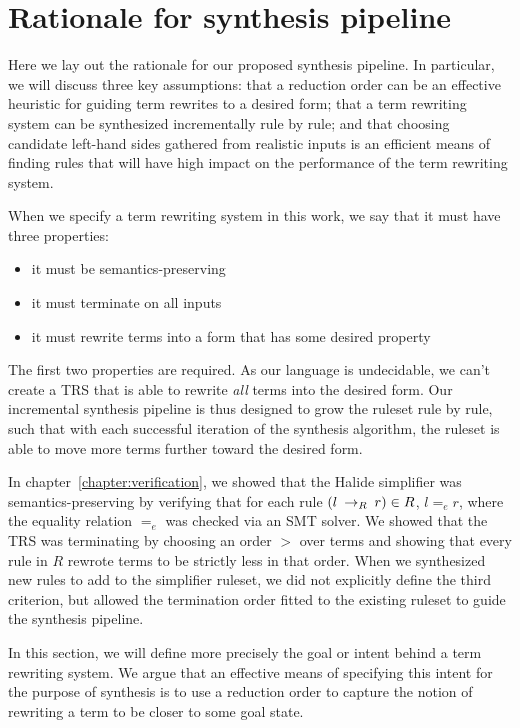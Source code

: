 \section{Rationale for synthesis pipeline}

Here we lay out the rationale for our proposed synthesis pipeline. In particular, we will discuss three key assumptions: that a reduction order can be an effective heuristic for guiding term rewrites to a desired form; that a term rewriting system can be synthesized incrementally rule by rule; and that choosing candidate left-hand sides gathered from realistic inputs is an efficient means of finding rules that will have high impact on the performance of the term rewriting system.

When we specify a term rewriting system in this work, we say that it must have three properties:

\begin{itemize}
    \item it must be semantics-preserving
    \item it must terminate on all inputs
    \item it must rewrite terms into a form that has some desired property
\end{itemize}

The first two properties are required. As our language is undecidable, we can't create a TRS that is able to rewrite \emph{all} terms into the desired form. Our incremental synthesis pipeline is thus designed to grow the ruleset rule by rule, such that with each successful iteration of the synthesis algorithm, the ruleset is able to move more terms further toward the desired form.

In chapter~\ref{chapter:verification}, we showed that the Halide simplifier was semantics-preserving by verifying that for each rule $(l \:\rightarrow_{R}\: r) \in R$, $l =_e r$, where the equality relation $=_e$ was checked via an SMT solver. We showed that the TRS was terminating by choosing an order $>$ over terms and showing that every rule in $R$ rewrote terms to be strictly less in that order. When we synthesized new rules to add to the simplifier ruleset, we did not explicitly define the third criterion, but allowed the termination order fitted to the existing ruleset to guide the synthesis pipeline. 

In this section, we will define more precisely the goal or intent behind a term rewriting system. We argue that an effective means of specifying this intent for the purpose of synthesis is to use a reduction order to capture the notion of rewriting a term to be closer to some goal state.

